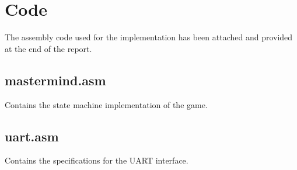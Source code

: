 \documentclass[usletter, 12pt]{article}
\begin{document}
    \section{Code}

        The assembly code used for the implementation has been attached and provided at the end of the report.

        \subsection{mastermind.asm}
        Contains the state machine implementation of the game.

        \subsection{uart.asm}
        Contains the specifications for the UART interface.

    \newpage

    \newpage
\end{document}
